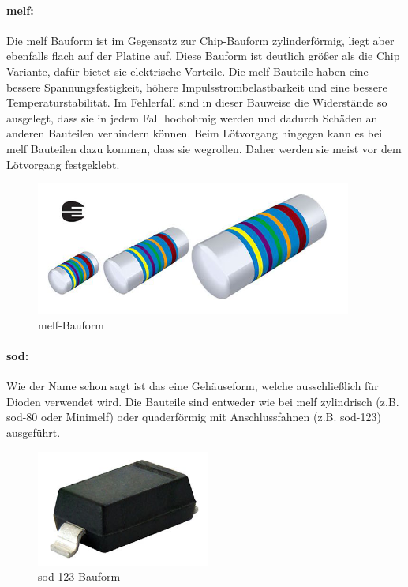 \paragraph{\ac{melf}:}
Die \ac{melf} Bauform ist im Gegensatz zur Chip-Bauform zylinderförmig, liegt aber ebenfalls flach auf der Platine auf.
Diese Bauform ist deutlich größer als die Chip Variante, dafür bietet sie elektrische Vorteile.
Die \ac{melf} Bauteile haben eine bessere Spannungsfestigkeit, höhere Impulsstrombelastbarkeit und eine bessere Temperaturstabilität.
Im Fehlerfall sind in dieser Bauweise die Widerstände so ausgelegt, dass sie in jedem Fall hochohmig werden und dadurch Schäden an anderen Bauteilen verhindern können.
Beim Lötvorgang hingegen kann es bei \ac{melf} Bauteilen dazu kommen, dass sie wegrollen. Daher werden sie meist vor dem Lötvorgang festgeklebt.
\begin{figure}[H]
	\centering
	\includegraphics{images/technische_grundlagen/melf.png}
	\caption{\ac{melf}-Bauform \cite[vgl.][]{vishay-melf}}
\end{figure}

\paragraph{\ac{sod}:}
Wie der Name schon sagt ist das eine Gehäuseform, welche ausschließlich für Dioden verwendet wird. Die Bauteile sind entweder wie bei \ac{melf} zylindrisch (z.B. \ac{sod}-80 oder Mini\ac{melf}) oder quaderförmig mit Anschlussfahnen (z.B. \ac{sod}-123) ausgeführt.
\begin{figure}[H]
	\centering
	\includegraphics{images/technische_grundlagen/sod-123.png}
	\caption{\ac{sod}-123-Bauform \cite[vgl.][]{vishay-sod-123}}
\end{figure}


